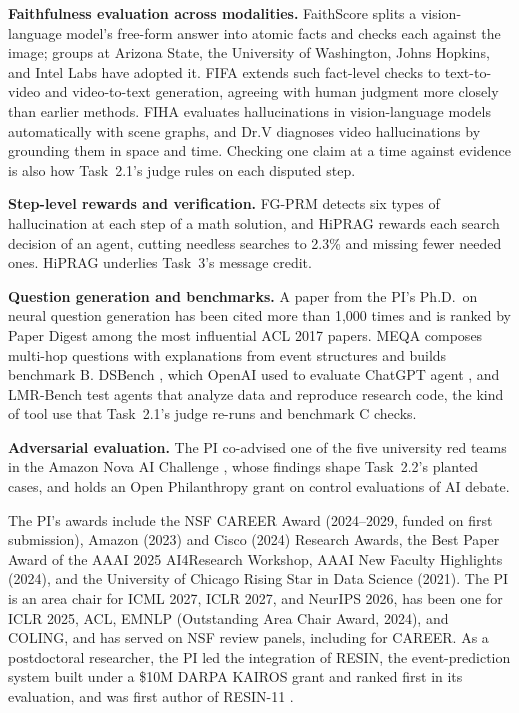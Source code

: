 \documentclass[12pt,letterpaper]{article}
\newcommand{\hd}[1]{\ifhmode\par\fi\addvspace{1pt}\noindent\textbf{#1}\hspace{0.35em}}
\begin{document}
\hd{Faithfulness evaluation across modalities.} FaithScore \citep{jing2024faithscore} splits a vision-language model's free-form answer into atomic facts and checks each against the image; groups at Arizona State, the University of Washington, Johns Hopkins, and Intel Labs have adopted it. FIFA \citep{jing2026fifa} extends such fact-level checks to text-to-video and video-to-text generation, agreeing with human judgment more closely than earlier methods. FIHA \citep{yan2025fiha} evaluates hallucinations in vision-language models automatically with scene graphs, and Dr.V \citep{luo2026drv} diagnoses video hallucinations by grounding them in space and time. Checking one claim at a time against evidence is also how Task~2.1's judge rules on each disputed step.

\hd{Step-level rewards and verification.} FG-PRM \citep{li2025fgprm} detects six types of hallucination at each step of a math solution, and HiPRAG \citep{wu2026hiprag} rewards each search decision of an agent, cutting needless searches to 2.3\% and missing fewer needed ones. HiPRAG underlies Task~3's message credit.

\hd{Question generation and benchmarks.} A paper from the PI's Ph.D.\ on neural question generation \citep{du2017learning} has been cited more than 1,000 times and is ranked by Paper Digest among the most influential ACL 2017 papers. MEQA \citep{li2024meqa} composes multi-hop questions with explanations from event structures and builds benchmark B. DSBench \citep{jing2025dsbench}, which OpenAI used to evaluate ChatGPT agent \citep{openai2025agent}, and LMR-Bench \citep{yan2025lmrbench} test agents that analyze data and reproduce research code, the kind of tool use that Task~2.1's judge re-runs and benchmark C checks.

\hd{Adversarial evaluation.} The PI co-advised one of the five university red teams in the Amazon Nova AI Challenge \citep{sahai2025nova,comet2025}, whose findings shape Task~2.2's planted cases, and holds an Open Philanthropy grant on control evaluations of AI debate.

The PI's awards include the NSF CAREER Award (2024--2029, funded on first submission), Amazon (2023) and Cisco (2024) Research Awards, the Best Paper Award of the AAAI 2025 AI4Research Workshop, AAAI New Faculty Highlights (2024), and the University of Chicago Rising Star in Data Science (2021). The PI is an area chair for ICML 2027, ICLR 2027, and NeurIPS 2026, has been one for ICLR 2025, ACL, EMNLP (Outstanding Area Chair Award, 2024), and COLING, and has served on NSF review panels, including for CAREER. As a postdoctoral researcher, the PI led the integration of RESIN, the event-prediction system built under a \$10M DARPA KAIROS grant and ranked first in its evaluation, and was first author of RESIN-11 \citep{du2022resin}.
\end{document}
